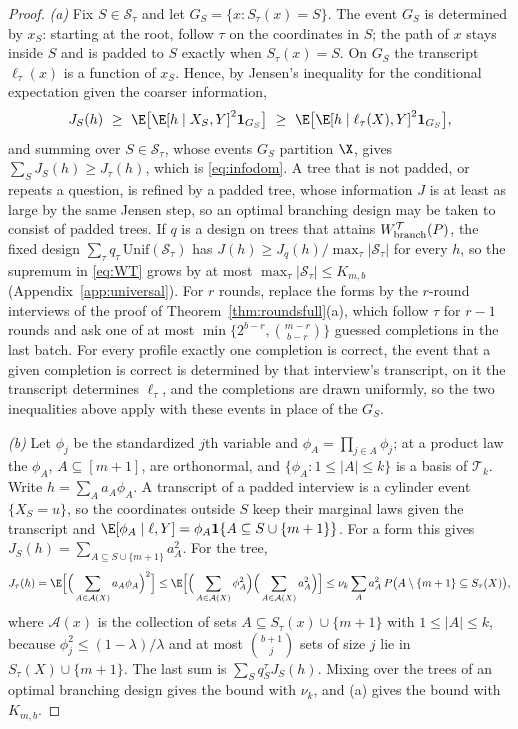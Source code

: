 \begin{proof}
\emph{(a)} Fix $S\in\mathcal S_\tau$ and let $G_S=\{x:S_\tau(x)=S\}$. The
event $G_S$ is determined by $x_S$: starting at the root, follow $\tau$ on
the coordinates in $S$; the path of $x$ stays inside $S$ and is padded to $S$
exactly when $S_\tau(x)=S$. On $G_S$ the transcript $\ell_\tau(x)$ is a
function of $x_S$. Hence, by Jensen's inequality for the conditional
expectation given the coarser information,
\[
 J_S(h)\ \ge\ \E\big[\E[h\mid X_S,Y]^2\mathbf 1_{G_S}\big]\ \ge\ \E\big[\E[h\mid\ell_\tau(X),Y]^2\mathbf 1_{G_S}\big],
\]
and summing over $S\in\mathcal S_\tau$, whose events $G_S$ partition $\X$,
gives $\sum_SJ_S(h)\ge J_\tau(h)$, which is \eqref{eq:infodom}. A tree that
is not padded, or repeats a question, is refined by a padded tree, whose
information $J$ is at least as large by the same Jensen step, so an optimal
branching design may be taken to consist of padded trees. If $q$ is a
design on trees that attains $W^{\mathcal T}_{\rm branch}(P)$, the fixed
design $\sum_\tau q_\tau\,\mathrm{Unif}(\mathcal S_\tau)$ has
$J(h)\ge J_q(h)/\max_\tau|\mathcal S_\tau|$ for every $h$, so the supremum in
\eqref{eq:WT} grows by at most $\max_\tau|\mathcal S_\tau|\le K_{m,b}$
(Appendix~\ref{app:universal}). For $r$ rounds, replace the forms by the
$r$-round interviews of the proof of Theorem~\ref{thm:roundsfull}(a), which
follow $\tau$ for $r-1$ rounds and ask one of at most
$\min\{2^{b-r},\binom{m-r}{b-r}\}$ guessed completions in the last batch. For every profile exactly one
completion is correct, the event that a given completion is correct is
determined by that interview's transcript, on it the transcript determines
$\ell_\tau$, and the completions are drawn uniformly, so the two inequalities
above apply with these events in place of the $G_S$.

\emph{(b)} Let $\phi_j$ be the standardized $j$th variable and
$\phi_A=\prod_{j\in A}\phi_j$; at a product law the $\phi_A$,
$A\subseteq[m+1]$, are orthonormal, and $\{\phi_A:1\le|A|\le k\}$ is a basis of
$\mathcal T_k$. Write $h=\sum_Aa_A\phi_A$. A transcript of a padded interview
is a cylinder event $\{X_S=u\}$, so the coordinates outside $S$ keep their
marginal laws given the transcript and
$\E[\phi_A\mid\ell,Y]=\phi_A\mathbf 1\{A\subseteq S\cup\{m+1\}\}$. For a form
this gives $J_S(h)=\sum_{A\subseteq S\cup\{m+1\}}a_A^2$. For the tree,
\[
 J_\tau(h)=\E\Big[\Big(\sum_{A\in\mathcal A(X)}a_A\phi_A\Big)^2\Big]
   \le\E\Big[\Big(\sum_{A\in\mathcal A(X)}\phi_A^2\Big)\Big(\sum_{A\in\mathcal A(X)}a_A^2\Big)\Big]
   \le\nu_k\sum_Aa_A^2\,P\big(A\setminus\{m+1\}\subseteq S_\tau(X)\big),
\]
where $\mathcal A(x)$ is the collection of sets $A\subseteq S_\tau(x)\cup\{m+1\}$ with $1\le|A|\le k$,
because $\phi_j^2\le(1-\lambda)/\lambda$ and at most $\binom{b+1}{j}$ sets of
size $j$ lie in $S_\tau(X)\cup\{m+1\}$. The last sum is
$\sum_Sq^\tau_SJ_S(h)$. Mixing over the trees of an optimal branching design
gives the bound with $\nu_k$, and (a) gives the bound with $K_{m,b}$.


\end{proof}
